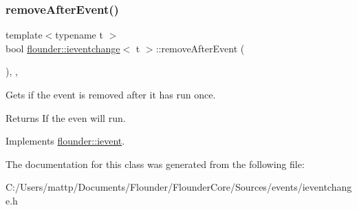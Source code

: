 \subsubsection{\texorpdfstring{remove\+After\+Event()}{removeAfterEvent()}}
{\footnotesize\ttfamily template$<$typename t $>$ \\
bool \hyperlink{classflounder_1_1ieventchange}{flounder\+::ieventchange}$<$ t $>$\+::remove\+After\+Event (\begin{DoxyParamCaption}{ }\end{DoxyParamCaption})\hspace{0.3cm}{\ttfamily [inline]}, {\ttfamily [override]}, {\ttfamily [virtual]}}



Gets if the event is removed after it has run once. 

\begin{DoxyReturn}{Returns}
If the even will run. 
\end{DoxyReturn}


Implements \hyperlink{classflounder_1_1ievent_a7017c8803df2397758980cb61020e801}{flounder\+::ievent}.



The documentation for this class was generated from the following file\+:\begin{DoxyCompactItemize}
\item 
C\+:/\+Users/mattp/\+Documents/\+Flounder/\+Flounder\+Core/\+Sources/events/ieventchange.\+h\end{DoxyCompactItemize}
